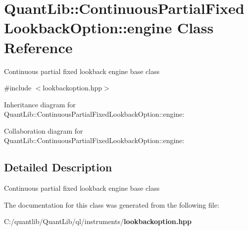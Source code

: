\section{Quant\+Lib\+:\+:Continuous\+Partial\+Fixed\+Lookback\+Option\+:\+:engine Class Reference}
\label{class_quant_lib_1_1_continuous_partial_fixed_lookback_option_1_1engine}


Continuous partial fixed lookback engine base class  




{\ttfamily \#include $<$lookbackoption.\+hpp$>$}



Inheritance diagram for Quant\+Lib\+:\+:Continuous\+Partial\+Fixed\+Lookback\+Option\+:\+:engine\+:


Collaboration diagram for Quant\+Lib\+:\+:Continuous\+Partial\+Fixed\+Lookback\+Option\+:\+:engine\+:


\subsection{Detailed Description}
Continuous partial fixed lookback engine base class 

The documentation for this class was generated from the following file\+:\begin{DoxyCompactItemize}
\item 
C\+:/quantlib/\+Quant\+Lib/ql/instruments/{\bf lookbackoption.\+hpp}\end{DoxyCompactItemize}

